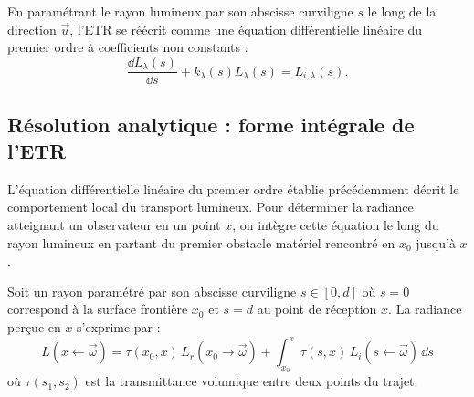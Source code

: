 \begin{proposition}
    En paramétrant le rayon lumineux par son abscisse curviligne $s$ le long de la direction $\vec{u}$, l'ETR se réécrit comme une équation différentielle linéaire du premier ordre à coefficients non constants :
    \begin{equation}
        \boxed{\frac{\dd L_\lambda(s)}{\dd s} + k_\lambda(s) L_\lambda(s) = L_{i, \lambda}(s).} \label{eq:etr-canonical}
    \end{equation}
\end{proposition}

\subsection{Résolution analytique : forme intégrale de l'ETR}

L'équation différentielle linéaire du premier ordre établie précédemment décrit le comportement local du transport lumineux. Pour déterminer la radiance atteignant un observateur en un point $x$, on intègre cette équation le long du rayon lumineux en partant du premier obstacle matériel rencontré en $x_0$ jusqu'à $x$.

\begin{theorem}
    Soit un rayon paramétré par son abscisse curviligne $s \in [0, d]$ où $s=0$ correspond à la surface frontière $x_0$ et $s=d$ au point de réception $x$. La radiance perçue en $x$ s'exprime par :
    \begin{equation}
        L(x \leftarrow \vec{\omega}) = \tau(x_0, x) \, L_r(x_0 \to \vec{\omega}) + \int_{x_0}^x \tau(s, x) \, L_i(s \leftarrow \vec{\omega}) \, \dd s
    \end{equation}
    où $\tau(s_1, s_2)$ est la transmittance volumique entre deux points du trajet.
\end{theorem}

